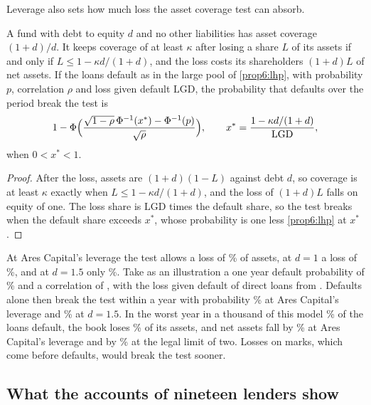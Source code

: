 \begin{chapterrefs}
Leverage also sets how much loss the asset coverage test can absorb.

\begin{proposition}\label{prop6:coverage}
A fund with debt to equity $d$ and no other liabilities has asset coverage $(1+d)/d$. It keeps coverage
of at least $\kappa$ after losing a share $L$ of its assets if and only if $L\le1-\kappa d/(1+d)$, and the
loss costs its shareholders $(1+d)L$ of net assets. If the loans default as in the large pool of
\cref{prop6:lhp}, with probability $p$, correlation $\rho$ and loss given default $\mathrm{LGD}$, the
probability that defaults over the period break the test is
\[
  1-\Phi\Bigl(\frac{\sqrt{1-\rho}\,\Phi^{-1}(x^*)-\Phi^{-1}(p)}{\sqrt\rho}\Bigr),\qquad
  x^*=\frac{1-\kappa d/(1+d)}{\mathrm{LGD}},
\]
when $0<x^*<1$.
\end{proposition}

\begin{proof}
After the loss, assets are $(1+d)(1-L)$ against debt $d$, so coverage is at least $\kappa$ exactly when
$L\le1-\kappa d/(1+d)$, and the loss of $(1+d)L$ falls on equity of one. The loss share is
$\mathrm{LGD}$ times the default share, so the test breaks when the default share exceeds $x^*$, whose
probability is one less \cref{prop6:lhp} at $x^*$.
\end{proof}

 At Ares Capital's leverage the test allows a loss of \acThrArcc\% of assets, at $d=1$ a loss of
\acThrOne\%, and at $d=1.5$ only \acThrOneHalf\%. Take as an illustration a one year default
probability of \acP\% and a correlation of \acRho, with the loss given default of direct loans from
\textcite{cai2024}. Defaults alone then break the test within a year with probability \acBreachArcc\% at
Ares Capital's leverage and \acBreachOneHalf\% at $d=1.5$. In the worst year in a thousand of this model
\acQ\% of the loans default, the book loses \acQloss\% of its assets, and net assets fall by \acQeq\% at
Ares Capital's leverage and by \acQeqTwo\% at the legal limit of two. Losses on marks, which come before
defaults, would break the test sooner.

\subsection{What the accounts of nineteen lenders show}


\end{chapterrefs}
